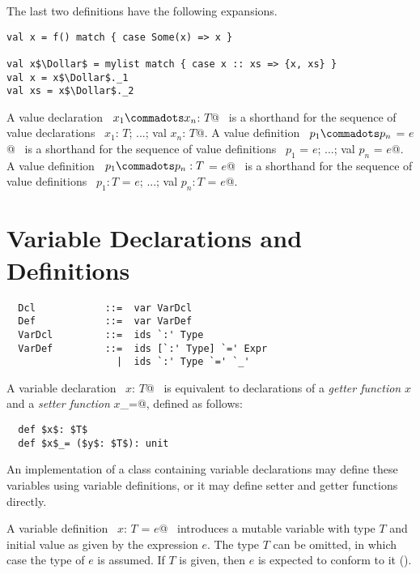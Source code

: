The last two definitions have the following expansions.
\begin{lstlisting}
val x = f() match { case Some(x) => x }

val x$\Dollar$ = mylist match { case x :: xs => {x, xs} }
val x = x$\Dollar$._1 
val xs = x$\Dollar$._2 
\end{lstlisting}

A value declaration ~\lstinline@val $x_1 \commadots x_n$: $T$@~
is a
shorthand for the sequence of value declarations
~\lstinline@val $x_1$: $T$; ...; val $x_n$: $T$@.
A value definition ~\lstinline@val $p_1 \commadots p_n$ = $e$@~
is a
shorthand for the sequence of value definitions
~\lstinline@val $p_1$ = $e$; ...; val $p_n$ = $e$@.
A value definition ~\lstinline@val $p_1 \commadots p_n: T$ = $e$@~
is a
shorthand for the sequence of value definitions
~\lstinline@val $p_1: T$ = $e$; ...; val $p_n: T$ = $e$@.

\section{Variable Declarations and Definitions}
\label{sec:vardef}

\syntax\begin{lstlisting}
  Dcl            ::=  var VarDcl
  Def            ::=  var VarDef
  VarDcl         ::=  ids `:' Type
  VarDef         ::=  ids [`:' Type] `=' Expr
                   |  ids `:' Type `=' `_'
\end{lstlisting}

A variable declaration ~\lstinline@var $x$: $T$@~ is equivalent to declarations
of a {\em getter function} $x$ and a {\em setter function}
\lstinline@$x$_=@, defined as follows:

\begin{lstlisting}
  def $x$: $T$ 
  def $x$_= ($y$: $T$): unit
\end{lstlisting}

An implementation of a class containing variable declarations
may define these variables using variable definitions, or it may
define setter and getter functions directly.

A variable definition ~\lstinline@var $x$: $T$ = $e$@~ introduces a
mutable variable with type $T$ and initial value as given by the
expression $e$. The type $T$ can be omitted, in which case the type of
$e$ is assumed. If $T$ is given, then $e$ is expected to conform to it
().

